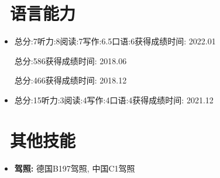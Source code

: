 \documentclass{resume}
\begin{document}
\section{\faLanguage\ 语言能力}
\begin{itemize}
  \item {}
  {总分:7}{听力:8}{阅读:7}{写作:6.5}{口语:6}{获得成绩时间: 2022.01}

  {总分:586}{}{}{}{}{获得成绩时间: 2018.06}

  {总分:466}{}{}{}{}{获得成绩时间: 2018.12}

  \vspace{0.1cm}
  \item {}
  {总分:15}{听力:3}{阅读:4}{写作:4}{口语:4}{获得成绩时间: 2021.12}
\end{itemize}
\vspace{0.4cm}

\section{\faWrench\ 其他技能}
\begin{itemize}
  \item \textbf{驾照:} 德国B197驾照, 中国C1驾照 
\end{itemize}
\end{document}
